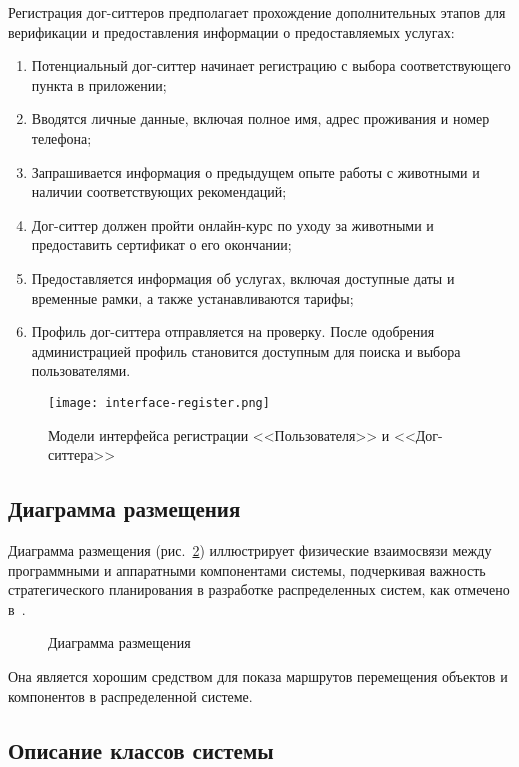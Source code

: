 Регистрация дог-ситтеров предполагает прохождение дополнительных этапов для верификации и предоставления информации о предоставляемых услугах:
\begin{enumerate}
    \item Потенциальный дог-ситтер начинает регистрацию с выбора соответствующего пункта в приложении;
    \item Вводятся личные данные, включая полное имя, адрес проживания и номер телефона;
    \item Запрашивается информация о предыдущем опыте работы с животными и наличии соответствующих рекомендаций;
    \item Дог-ситтер должен пройти онлайн-курс по уходу за животными и предоставить сертификат о его окончании;
    \item Предоставляется информация об услугах, включая доступные даты и временные рамки, а также устанавливаются тарифы;
    \item Профиль дог-ситтера отправляется на проверку. После одобрения администрацией профиль становится доступным для поиска и выбора пользователями.
\end{enumerate}


\begin{figure}[h!]
    \texttt{[image: interface-register.png]}
    \caption{Модели интерфейса регистрации <<Пользователя>> и <<Дог-ситтера>>}
    \label{fig:register}
\end{figure}

\subsection{Диаграмма размещения}
Диаграмма размещения (рис.~\ref{place:image}) иллюстрирует физические взаимосвязи между программными и аппаратными компонентами системы, подчеркивая важность стратегического планирования в разработке распределенных систем, как отмечено в~\cite{makni}.

\begin{figure}[ht]
\caption{Диаграмма размещения}
\label{place:image}
\end{figure}

Она является хорошим средством для показа маршрутов перемещения объектов и компонентов в распределенной системе.

\subsection{Описание классов системы}

